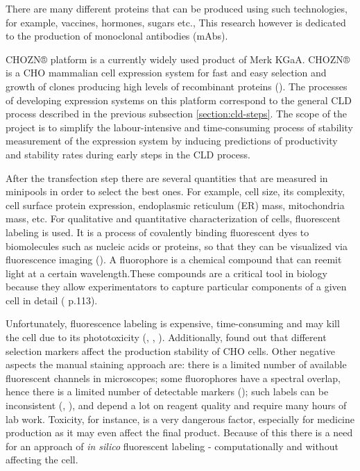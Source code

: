 There are many different proteins that can be produced using such technologies, for example, vaccines, hormones, sugars etc., This research however is dedicated to the production of monoclonal antibodies (mAbs). 

CHOZN® platform is a currently widely used product of Merk KGaA. CHOZN® is a CHO mammalian cell expression system for fast and easy selection and growth of clones producing high levels of recombinant proteins (\cite{chozn}). The processes of developing expression systems on this platform correspond to the general CLD process described in the previous subsection \ref{section:cld-steps}. The scope of the project is to simplify the labour-intensive and time-consuming process of stability measurement of the expression system by inducing predictions of productivity and stability rates during early steps in the CLD process. 

After the transfection step there are several quantities that are measured in minipools in order to select the best ones. For example, cell size, its complexity, cell surface protein expression, endoplasmic reticulum (ER) mass, mitochondria mass, etc. For qualitative and quantitative characterization of cells, fluorescent labeling is used. It is a process of covalently binding fluorescent dyes to biomolecules such as nucleic acids or proteins, so that they can be visualized via fluorescence imaging (\cite{fluorescent_labeling}). A fluorophore is a chemical compound that can reemit light at a certain wavelength.These compounds are a critical tool in biology because they allow experimentators to capture particular components of a given cell in detail (\cite{DL_for_LS} p.113). 

Unfortunately, fluorescence labeling is expensive, time-consuming and may kill the cell due to its phototoxicity (\cite{Fried_1982}, \cite{Patil_2018}, \cite{Progatzky_2013}). Additionally, \cite{Yeo_2017} found out that different selection markers affect the production stability of CHO cells. Other negative aspects  the manual staining approach are: there is a limited number of available fluorescent channels in microscopes; some fluorophores have a spectral overlap, hence there is a limited number of detectable markers (\cite{Perfetto_2004}); such labels can be inconsistent (\cite{Burry_2011}, \cite{Weigert_1970}), and depend a lot on reagent quality and require many hours of lab work. Toxicity, for instance, is a very dangerous factor, especially for medicine production as it may even affect the final product. Because of this there is a need for an approach of \textit{in silico} fluorescent labeling - computationally and without affecting the cell. 

